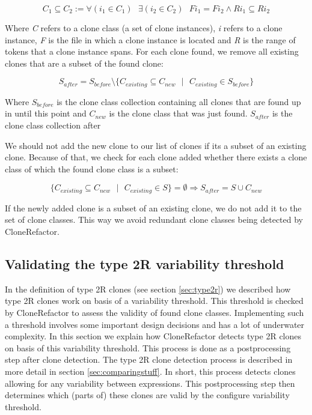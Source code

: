 \begin{equation}\label{eq:subset}
C_1 \subseteq C_2 := \forall (i_1 \in C_1) \text{ } \exists (i_2 \in C_2) \text{ } F i_1 = F i_2 \wedge R i_1 \subseteq R i_2
\end{equation} %

Where \textit{C} refers to a clone class (a set of clone instances), \textit{i} refers to a clone instance, \textit{F} is the file in which a clone instance is located and \textit{R} is the range of tokens that a clone instance spans. For each clone found, we remove all existing clones that are a subset of the found clone:

\begin{equation}\label{eq:removeall}
S_{after} = S_{before} \setminus \{C_{existing} \subseteq C_{new}\text{ }|\text{ }C_{existing} \in S_{before}\}
\end{equation}

Where \textit{$S_{before}$} is the clone class collection containing all clones that are found up in until this point and \textit{$C_{new}$} is the clone class that was just found. \textit{$S_{after}$} is the clone class collection after

We should not add the new clone to our list of clones if its a subset of an existing clone. Because of that, we check for each clone added whether there exists a clone class of which the found clone class is a subset:

\begin{equation}\label{eq:removeexisting}
\{C_{existing} \subseteq C_{new}\text{ }|\text{ }C_{existing} \in S\} = \emptyset \Rightarrow S_{after} = S \cup C_{new}
\end{equation}

If the newly added clone is a subset of an existing clone, we do not add it to the set of clone classes. This way we avoid redundant clone classes being detected by CloneRefactor.

\subsection{Validating the type 2R variability threshold}
In the definition of type 2R clones (see section \ref{sec:type2r}) we described how type 2R clones work on basis of a variability threshold. This threshold is checked by CloneRefactor to assess the validity of found clone classes. Implementing such a threshold involves some important design decisions and has a lot of underwater complexity. In this section we explain how CloneRefactor detects type 2R clones on basis of this variability threshold. This process is done as a postprocessing step after clone detection. The type 2R clone detection process is described in more detail in section \ref{sec:comparingstuff}. In short, this process detects clones allowing for any variability between expressions. This postprocessing step then determines which (parts of) these clones are valid by the configure variability threshold.

